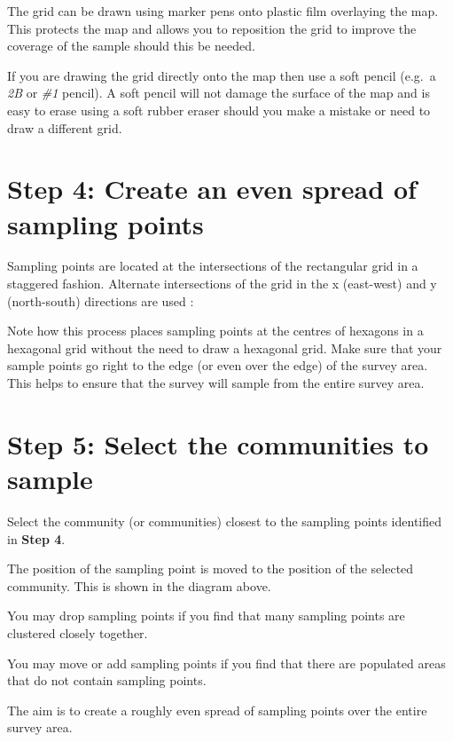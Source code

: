 \documentclass[12pt,a4paper]{book}
\theoremstyle{definition}
\theoremstyle{definition}
\theoremstyle{definition}
\theoremstyle{remark}
\begin{document}
The grid can be drawn using marker pens onto plastic film overlaying the
map. This protects the map and allows you to reposition the grid to
improve the coverage of the sample should this be needed.

If you are drawing the grid directly onto the map then use a soft pencil
(e.g.~a \emph{2B} or \emph{\#1} pencil). A soft pencil will not damage
the surface of the map and is easy to erase using a soft rubber eraser
should you make a mistake or need to draw a different grid.

\newpage

\hypertarget{step-4-create-an-even-spread-of-sampling-points}{%
\section{Step 4: Create an even spread of sampling
points}\label{step-4-create-an-even-spread-of-sampling-points}}

Sampling points are located at the intersections of the rectangular grid
in a staggered fashion. Alternate intersections of the grid in the x
(east-west) and y (north-south) directions are used :

Note how this process places sampling points at the centres of hexagons
in a hexagonal grid without the need to draw a hexagonal grid. Make sure
that your sample points go right to the edge (or even over the edge) of
the survey area. This helps to ensure that the survey will sample from
the entire survey area.

\newpage

\hypertarget{step-5-select-the-communities-to-sample}{%
\section{Step 5: Select the communities to
sample}\label{step-5-select-the-communities-to-sample}}

Select the community (or communities) closest to the sampling points
identified in \textbf{Step 4}.

The position of the sampling point is moved to the position of the
selected community. This is shown in the diagram above.

You may drop sampling points if you find that many sampling points are
clustered closely together.

You may move or add sampling points if you find that there are populated
areas that do not contain sampling points.

The aim is to create a roughly even spread of sampling points over the
entire survey area.
\end{document}
